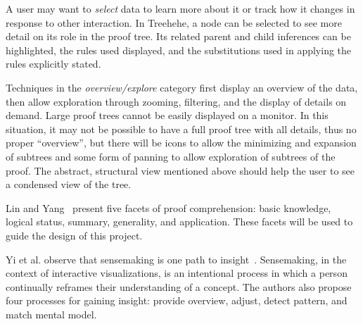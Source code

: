 \documentclass[12pt]{article}
\newcommand{\projectname}{Treehehe}
\begin{document}
A user may want to \textit{select} data to learn more about it or track how it changes in response to other interaction. In \projectname{}, a node can be selected to see more detail on its role in the proof tree. Its related parent and child inferences can be highlighted, the rules used displayed, and the substitutions used in applying the rules explicitly stated.

Techniques in the \textit{overview/explore} category first display an overview of the data, then allow exploration through zooming, filtering, and the display of details on demand. Large proof trees cannot be easily displayed on a monitor. In this situation, it may not be possible to have a full proof tree with all details, thus no proper ``overview'', but there will be icons to allow the minimizing and expansion of subtrees and some form of panning to allow exploration of subtrees of the proof. The abstract, structural view mentioned above should help the user to see a condensed view of the tree. 

Lin and Yang~\cite{readingcompgeometry-yang+lin} present five facets of proof comprehension: basic knowledge, logical status, summary, generality, and application. These facets will be used to guide the design of this project.






Yi et al. observe that sensemaking is one path to insight~\cite{insights-yi+etal}. Sensemaking, in the context of interactive visualizations, is an intentional process in which a person continually reframes their understanding of a concept. The authors also propose four processes for gaining insight: provide overview, adjust, detect pattern, and match mental model.
\end{document}
